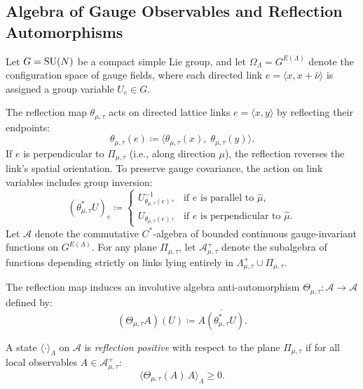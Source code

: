 \subsection{Algebra of Gauge Observables and Reflection Automorphisms}
\label{subsec:algebra_observables_reflection}

Let $G = \mathrm{SU}(N)$ be a compact simple Lie group, and let $\Omega_\Lambda = G^{E(\Lambda)}$ denote the configuration space of gauge fields, where each directed link $e = \langle x, x + \hat{\nu} \rangle$ is assigned a group variable $U_e \in G$.

The reflection map $\theta_{\mu, \tau}$ acts on directed lattice links $e = \langle x, y \rangle$ by reflecting their endpoints:
\begin{equation}
\theta_{\mu, \tau}(e) \coloneqq \langle \theta_{\mu, \tau}(x), \; \theta_{\mu, \tau}(y) \rangle.
\end{equation}
If $e$ is perpendicular to $\Pi_{\mu, \tau}$ (i.e., along direction $\mu$), the reflection reverses the link's spatial orientation. To preserve gauge covariance, the action on link variables includes group inversion:
\begin{equation}
\label{eq:theta_star_link_action}
(\theta_{\mu, \tau}^* U)_e \coloneqq \begin{cases}
U_{\theta_{\mu, \tau}(e)}^{-1}, & \text{if } e \text{ is parallel to } \hat{\mu}, \\
U_{\theta_{\mu, \tau}(e)}, & \text{if } e \text{ is perpendicular to } \hat{\mu}.
\end{cases}
\end{equation}
Let $\mathcal{A}$ denote the commutative $C^*$-algebra of bounded continuous gauge-invariant functions on $G^{E(\Lambda)}$. For any plane $\Pi_{\mu, \tau}$, let $\mathcal{A}_{\mu, \tau}^+$ denote the subalgebra of functions depending strictly on links lying entirely in $\Lambda_{\mu, \tau}^+ \cup \Pi_{\mu, \tau}$.

The reflection map induces an involutive algebra anti-automorphism $\Theta_{\mu, \tau} : \mathcal{A} \to \mathcal{A}$ defined by:
\begin{equation}
\label{eq:theta_algebra_action}
(\Theta_{\mu, \tau} A)(U) \coloneqq \overline{A(\theta_{\mu, \tau}^* U)}.
\end{equation}

\begin{definition}
\label{def:reflection_positive_torus}
A state $\langle \cdot \rangle_\Lambda$ on $\mathcal{A}$ is \emph{reflection positive} with respect to the plane $\Pi_{\mu, \tau}$ if for all local observables $A \in \mathcal{A}_{\mu, \tau}^+$:
\begin{equation}
\label{eq:rp_bilinear_app}
\langle \Theta_{\mu, \tau}(A) \, A \rangle_\Lambda \ge 0.
\end{equation}
\end{definition}

